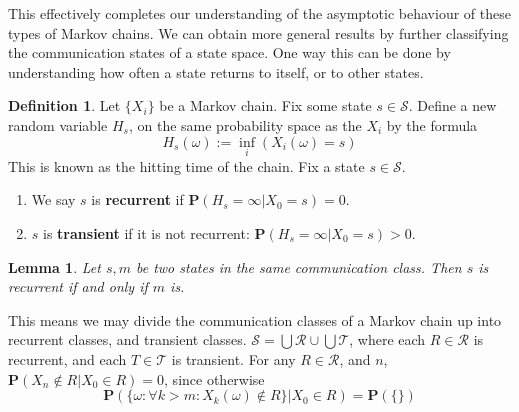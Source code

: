 \documentclass[12pt]{report}
\theoremstyle{plain}
\newtheorem{lemma}[theorem]{Lemma}
\theoremstyle{definition}
\newtheorem*{defi}{Definition}
\newenvironment{definition}
    {\begin{samepage}\begin{framed}\begin{defi}}
    {\end{defi}\end{framed}\end{samepage}}
\begin{document}
This effectively completes our understanding of the asymptotic behaviour of these types of Markov chains. We can obtain more general results by further classifying the communication states of a state space. One way this can be done by understanding how often a state returns to itself, or to other states.

\begin{definition}
    Let $\{ X_i \}$ be a Markov chain. Fix some state $s \in \mathcal{S}$. Define a new random variable $H_s$, on the same probability space as the $X_i$ by the formula
    \[ H_s(\omega) := \inf_i(X_i(\omega) = s) \]
    This is known as the hitting time of the chain. Fix a state $s \in \mathcal{S}$.
    \begin{enumerate}
        \item We say $s$ is {\bf recurrent} if $\mathbf{P}(H_s = \infty | X_0 = s) = 0$.
        \item $s$ is {\bf transient} if it is not recurrent: $\mathbf{P}(H_s = \infty | X_0 = s) > 0$.
    \end{enumerate}
\end{definition}

\begin{lemma}
    Let $s,m$ be two states in the same communication class. Then $s$ is recurrent if and only if $m$ is.
\end{lemma}

This means we may divide the communication classes of a Markov chain up into recurrent classes, and transient classes. $\mathcal{S} = \bigcup \mathcal{R} \cup \bigcup \mathcal{T}$, where each $R \in \mathcal{R}$ is recurrent, and each $T \in \mathcal{T}$ is transient. For any $R \in \mathcal{R}$, and $n$, $\mathbf{P}(X_n \not \in R | X_0 \in R) = 0$, since otherwise
%
\[ \mathbf{P}(\{ \omega: \forall k > m: X_k(\omega) \not \in R \} | X_0 \in R ) = \mathbf{P}(\{  \}) \]
\end{document}

